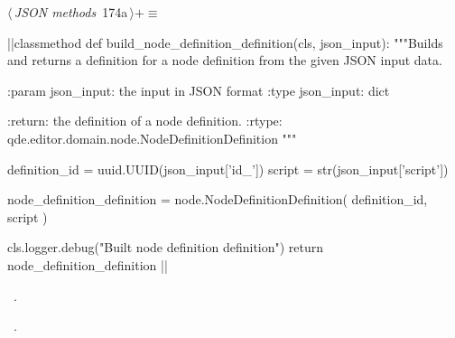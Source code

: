 \documentclass[%
    a4paper,    %
    justified,  %
    nobib,      %
    openany     %
]{tufte-book}
\begin{document}
\begin{flushleft} \small
\begin{minipage}{\linewidth}\label{scrap199}\raggedright\small
{} $\langle\,${\itshape JSON methods}\nobreak\ {\footnotesize {174a}}$\,\rangle+\equiv$
\vspace{-1ex}
\begin{pythoncode}
|\normalfont{}\fontfamily{}|classmethod
def build_node_definition_definition(cls, json_input):
    """Builds and returns a definition for a node definition from the given
    JSON input data.

    :param json_input: the input in JSON format
    :type  json_input: dict

    :return: the definition of a node definition.
    :rtype:  qde.editor.domain.node.NodeDefinitionDefinition
    """

    definition_id = uuid.UUID(json_input['id_'])
    script        = str(json_input['script'])

    node_definition_definition = node.NodeDefinitionDefinition(
        definition_id,
        script
    )

    cls.logger.debug("Built node definition definition")
    return node_definition_definition
|\NWsep|
\end{pythoncode}
\vspace{1.5ex}
\footnotesize
\begin{list}{}{\setlength{\itemsep}{-\parsep}\setlength{\itemindent}{-\leftmargin}}
\item \NWtxtMacroDefBy\ .
\item \NWtxtMacroRefIn\ .

\item{}
\end{list}
\end{minipage}\vspace{4ex}
\end{flushleft}
\end{document}
